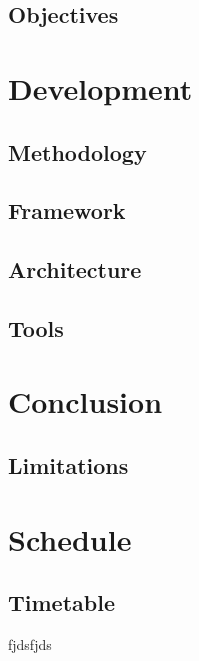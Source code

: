 \documentclass[a4paper, 11pt]{article}
\begin{document}
\subsection{Objectives}
\clearpage


\section{Development}
\subsection{Methodology}
\subsection{Framework}
\subsection{Architecture}
\subsection{Tools}

\clearpage

\section{Conclusion}
\subsection{Limitations}

\clearpage


\section{Schedule}
\subsection{Timetable}

\clearpage


\begin{thebibliography}{11}

	fjdsfjds

\end{thebibliography}
\end{document}
